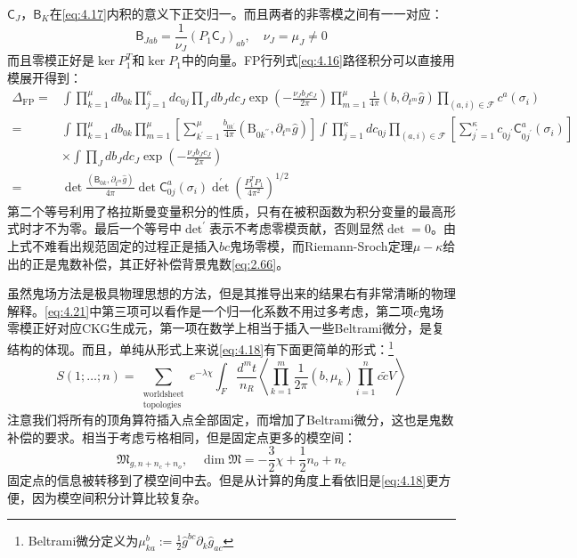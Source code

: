 $\mathsf{C}_J$，$\mathsf{B}_{K}$在\ref{eq:4.17}内积的意义下正交归一。而且两者的非零模之间有一一对应：
\begin{equation}
	\mathsf{B}_{Jab}=\frac{1}{\nu_J}(P_1\mathsf{C}_J)_{ab},\quad\nu_J=\mu_J\neq0
\end{equation}
而且零模正好是$\ker P_1^T$和$\ker{P_1}$中的向量。FP行列式\ref{eq:4.16}路径积分可以直接用模展开得到：
\begin{equation}
	\label{eq:4.21}
	\begin{aligned}
		\Delta_{\text{FP}}=&\int\prod_{k=1}^\mu db_{0k}\prod_{j=1}^\kappa dc_{0j}\prod_Jdb_Jdc_J\exp\left(-\frac{\nu_Jb_Jc_J}{2\pi}\right)\prod_{m=1}^\mu\frac{1}{4\pi}(b,\partial_{t^{m}}\hat{g})\prod_{(a,i)\in\mathcal{F}}c^a(\sigma_i)\\
		=&\int\prod_{k=1}^\mu db_{0k}\prod_{m=1}^\mu\left[\sum_{k^{\prime}=1}^\mu\frac{b_{0k^{\prime}}}{4\pi}\left(\mathrm{B}_{0k^{\prime\prime}},\partial_{t^m}\hat{g}\right)\right]
		\int\prod_{j=1}^\kappa dc_{0j}\prod_{(a,i)\in\mathcal{F}}\left[\sum_{j^{\prime}=1}^\kappa c_{0j^{\prime}}\mathsf{C}_{0j^{\prime}}^a(\sigma_i)\right]
		\\
		&\times\int\prod_Jdb_Jdc_J\exp\left(-\frac{\nu_Jb_Jc_J}{2\pi}\right)\\
		=&\det\frac{(\mathsf{B}_{0k},\partial_{t^m}\hat{g})}{4\pi}{\det}\mathsf{C}_{0j}^a(\sigma_i){\det}^{\prime}\left(\frac{P_1^TP_1}{4\pi^2}\right)^{1/2}
	\end{aligned}
\end{equation}
第二个等号利用了格拉斯曼变量积分的性质，只有在被积函数为积分变量的最高形式时才不为零。最后一个等号中${\det}^\prime$表示不考虑零模贡献，否则显然$\det=0$。由上式不难看出规范固定的过程正是插入$bc$鬼场零模，而Riemann-Sroch定理$\mu-\kappa$给出的正是鬼数补偿，其正好补偿背景鬼数\ref{eq:2.66}。

虽然鬼场方法是极具物理思想的方法，但是其推导出来的结果右有非常清晰的物理解释。\ref{eq:4.21}中第三项可以看作是一个归一化系数不用过多考虑，第二项$c$鬼场零模正好对应CKG生成元，第一项在数学上相当于插入一些Beltrami微分，是复结构的体现。而且，单纯从形式上来说\ref{eq:4.18}有下面更简单的形式：\footnote{Beltrami微分定义为$\mu_{ka}^b:=\frac{1}{2}\hat{g}^{bc}\partial_k\hat{g}_{ac}$}
\begin{equation}
	\label{eq:4.22}
	S(1;\ldots;n)=\sum_{\substack{\text{worldsheet}\\\text{topologies}}}e^{-\lambda\chi}\int_F\frac{d^mt}{n_R}\left\langle\prod_{k=1}^m\frac{1}{2\pi}(b,\mu_k)\prod_{i=1}^nc\tilde{c}V\right\rangle
\end{equation}
注意我们将所有的顶角算符插入点全部固定，而增加了Beltrami微分，这也是鬼数补偿的要求。相当于考虑亏格相同，但是固定点更多的模空间：
\begin{equation}
	\mathfrak{M}_{g,n+n_c+n_o},\quad \dim\mathfrak{M} = -\frac32 \chi + \frac12 n_o+n_c
\end{equation}
固定点的信息被转移到了模空间中去。但是从计算的角度上看依旧是\ref{eq:4.18}更方便，因为模空间积分计算比较复杂。

